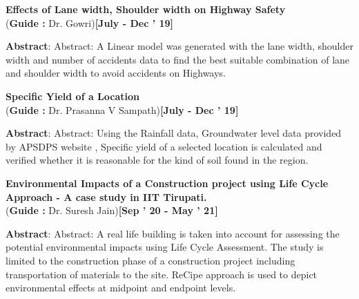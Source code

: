 \documentclass[a4paper,10pt]{article}
\begin{document}
\begin{itemize*}
\setlength{\itemsep}{1pt}
\item \textbf{Effects of Lane width, Shoulder width on Highway Safety}
 \\ {(\textbf{Guide :} Dr. Gowri)}\hfill {\small{{\textbf{[July - Dec ' 19]}}\/}}
\begin{itemize*}
\setlength{\itemsep}{.00pt}

            \item \textbf{Abstract}: Abstract: A Linear model was generated with the lane width, shoulder width and number of accidents
data to find the best suitable combination of lane and shoulder width to avoid accidents on Highways. 

            \end{itemize*} 

            \end{itemize*} 

\begin{itemize*}
\setlength{\itemsep}{1pt}
\item \textbf{Specific Yield of a Location}
 \\ {(\textbf{Guide :} Dr. Prasanna V Sampath)}\hfill {\small{{\textbf{[July - Dec ' 19]}}\/}}
\begin{itemize*}
\setlength{\itemsep}{.00pt}

            \item \textbf{Abstract}: Abstract: Using the Rainfall data, Groundwater level data provided by APSDPS website , Specific yield
of a selected location is calculated and verified whether it is reasonable for the kind of soil found in the
region.
 

            \end{itemize*} 

            \end{itemize*} 

\begin{itemize*}
\setlength{\itemsep}{1pt}
\item \textbf{Environmental Impacts of a Construction project using Life Cycle Approach - A case study in IIT Tirupati.}
 \\ {(\textbf{Guide :} Dr. Suresh Jain)}\hfill {\small{{\textbf{[Sep ’ 20 - May ’ 21]}}\/}}
\begin{itemize*}
\setlength{\itemsep}{.00pt}

            \item \textbf{Abstract}: Abstract: A real life building is taken into account for assessing the potential environmental impacts
using Life Cycle Assessment. The study is limited to the construction phase of a construction project
including transportation of materials to the site. ReCipe approach is used to depict environmental effects
at midpoint and endpoint levels. 

            \end{itemize*} 

            \end{itemize*} 
\end{document}
